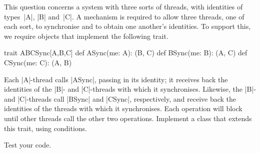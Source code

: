 \begin{question}
This question concerns a system with three sorts of threads, with identities
of types~|A|, |B| and~|C|.  A mechanism is required to allow three threads,
one of each sort, to synchronise and to obtain one another's identities. 
To support this, we require objects that implement the following trait.
%
\begin{scala}
trait ABCSync[A,B,C]{
  def ASync(me: A): (B, C)
  def BSync(me: B): (A, C)
  def CSync(me: C): (A, B)
}
\end{scala}
%
Each |A|-thread calls |ASync|, passing in its identity; it receives back the
identities of the |B|- and |C|-threads with which it synchronises.  Likewise,
the |B|- and |C|-threads call |BSync| and |CSync|, respectively, and receive
back the identities of the threads with which it synchronises.  Each operation
will block until other threads call the other two operations.  Implement a
class that extends this trait, using conditions.

Test your code.
\end{question}


